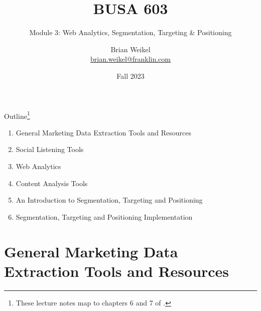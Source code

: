 \documentclass[pdf]{beamer}
\title{BUSA 603}
\subtitle{Module 3:   Web Analytics, Segmentation, Targeting \& Positioning}
\theoremstyle{remark}
\theoremstyle{definition}
\begin{document}
\author[B. Weikel, Franklin University]{
	\begin{tabular}{c} 
	\Large
	Brian Weikel\\
    \footnotesize \href{mailto:brian.weikel@franklin.edu}{brian.weikel@franklin.com}
    \vspace{1ex}
\end{tabular}
\vspace{-4ex}}


\date{Fall 2023}%

\begin{noheadline}
\begin{frame}[t]\maketitle\end{frame}
\end{noheadline}

\begin{frame}[t]{Outline\footnote{These lecture notes map to chapters 6 and 7 of \cite{davis2022}.}}
\begin{enumerate}
\item General Marketing Data Extraction Tools and Resources
\vspace{1.5ex}
\item Social Listening Tools
\vspace{1.5ex}
\item Web Analytics
\vspace{1.5ex}
\item Content Analysis Tools
\vspace{1.5ex}
\item An Introduction to Segmentation, Targeting and Positioning 
\vspace{1.5ex}
\item Segmentation, Targeting and Positioning Implementation
\end{enumerate}
\end{frame}

\section{General Marketing Data Extraction Tools and Resources}
\end{document}
